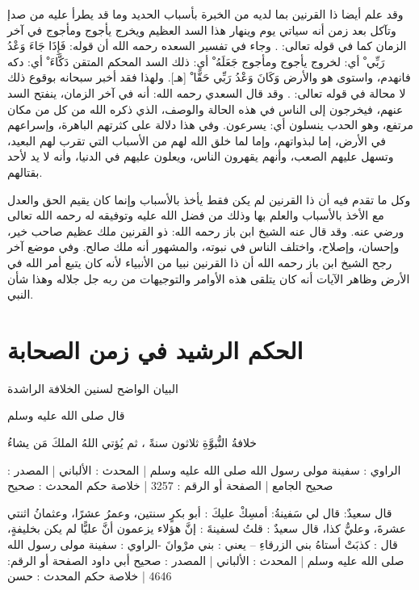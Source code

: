 وقد علم أيضا ذا القرنين بما لديه من الخبرة بأسباب الحديد وما قد يطرأ عليه من صدإ وتآكل بعد زمن أنه سياتي يوم وينهار هذا السد العظيم ويخرج يأجوج ومأجوج في آخر الزمان كما في قوله تعالى: 
\quranayah*[18][98][6]{\footnotesize \surahname*[18]}. وجاء في تفسير السعده رحمه الله أن قوله: { فَإِذَا جَاءَ وَعْدُ رَبِّي ْ} أي: لخروج يأجوج ومأجوج { جَعَلَهُ ْ} أي: ذلك السد المحكم المتقن { دَكَّاءَ ْ} أي: دكه فانهدم، واستوى هو والأرض { وَكَانَ وَعْدُ رَبِّي حَقًّا ْ} [هـ]. ولهذا فقد أخبر سبحانه بوقوع ذلك لا محالة في قوله تعالى: 
\quranayah*[21][96]{\footnotesize \surahname*[21]}. وقد قال السعدي رحمه الله: أنه في آخر الزمان، ينفتح السد عنهم، فيخرجون إلى الناس في هذه الحالة والوصف، الذي ذكره الله من كل من مكان مرتفع، وهو الحدب ينسلون أي: يسرعون. وفي هذا دلالة على كثرتهم الباهرة، وإسراعهم في الأرض، إما لبذواتهم، وإما لما خلق الله لهم من الأسباب التي تقرب لهم البعيد، وتسهل عليهم الصعب، وأنهم يقهرون الناس، ويعلون عليهم في الدنيا، وأنه لا يد لأحد بقتالهم. 

وكل ما تقدم فيه أن ذا القرنين لم يكن فقط يأخذ بالأسباب وإنما كان يقيم الحق والعدل مع الأخذ بالأسباب والعلم بها وذلك من فضل الله عليه وتوفيقه له رحمه الله تعالى ورضي عنه. وقد قال عنه الشيخ ابن باز رحمه الله: ذو القرنين ملك عظيم صاحب خير، وإحسان، وإصلاح، واختلف الناس في نبوته، والمشهور أنه ملك صالح. وفي موضع آخر رجح الشيخ ابن باز رحمه الله أن ذا القرنين نبيا من الأنبياء لأنه كان يتبع أمر الله في الأرض وظاهر الآيات أنه كان يتلقى هذه الأوامر والتوجيهات من ربه جل جلاله وهذا شأن النبي.


\section{الحكم الرشيد في زمن الصحابة}


البيان الواضح لسنين الخلافة الراشدة


قال صلى الله عليه وسلم 

خلافةُ النُّبوَّةِ ثلاثون سنةً ، ثم يُؤتي اللهُ الملكَ مَن يشاءُ

الراوي : سفينة مولى رسول الله صلى الله عليه وسلم | المحدث : الألباني | المصدر : صحيح الجامع | الصفحة أو الرقم : 3257 | خلاصة حكم المحدث : صحيح
   
قال سعيدٌ: قال لي سَفينةُ: أمسِكْ عليكَ : أبو بكرٍ سنتين، وعمرُ عشرًا، وعثمانُ اثنتي عشرةَ، وعليُّ كذا، قال سعيدٌ : قلتُ لسفينةَ : إنَّ هؤلاء يزعمون أنَّ عليًّا لم يكن بخليفةٍ، قال : كذبَتْ أستاهُ بني الزرقاءِ – يعني : بني مرْوانَ -الراوي : سفينة مولى رسول الله صلى الله عليه وسلم | المحدث : الألباني | المصدر : صحيح أبي داود
الصفحة أو الرقم: 4646 | خلاصة حكم المحدث : حسن

